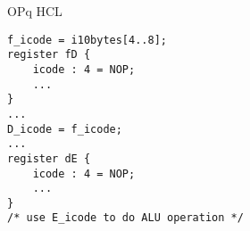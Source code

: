 \begin{frame}[fragile,label=OPqHCL]{OPq HCL}
\begin{Verbatim}[fontsize=\small]
f_icode = i10bytes[4..8];
register fD {
    icode : 4 = NOP;
    ...
}
...
D_icode = f_icode;
...
register dE {
    icode : 4 = NOP;
    ...
}
/* use E_icode to do ALU operation */
\end{Verbatim}
\end{frame}
